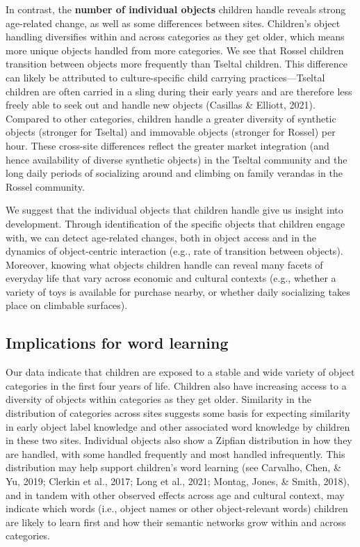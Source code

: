 \documentclass[10pt, letterpaper]{article}
\begin{document}
In contrast, the \textbf{number of individual objects} children handle
reveals strong age-related change, as well as some differences between
sites. Children's object handling diversifies within and across
categories as they get older, which means more unique objects handled
from more categories. We see that Rossel children transition between
objects more frequently than Tseltal children. This difference can
likely be attributed to culture-specific child carrying
practices---Tseltal children are often carried in a sling during their
early years and are therefore less freely able to seek out and handle
new objects (Casillas \& Elliott, 2021). Compared to other categories,
children handle a greater diversity of synthetic objects (stronger for
Tseltal) and immovable objects (stronger for Rossel) per hour. These
cross-site differences reflect the greater market integration (and hence
availability of diverse synthetic objects) in the Tseltal community and
the long daily periods of socializing around and climbing on family
verandas in the Rossel community.

We suggest that the individual objects that children handle give us
insight into development. Through identification of the specific objects
that children engage with, we can detect age-related changes, both in
object access and in the dynamics of object-centric interaction (e.g.,
rate of transition between objects). Moreover, knowing what objects
children handle can reveal many facets of everyday life that vary across
economic and cultural contexts (e.g., whether a variety of toys is
available for purchase nearby, or whether daily socializing takes place
on climbable surfaces).

\hypertarget{implications-for-word-learning}{%
\subsection{Implications for word
learning}\label{implications-for-word-learning}}

Our data indicate that children are exposed to a stable and wide variety
of object categories in the first four years of life. Children also have
increasing access to a diversity of objects within categories as they
get older. Similarity in the distribution of categories across sites
suggests some basis for expecting similarity in early object label
knowledge and other associated word knowledge by children in these two
sites. Individual objects also show a Zipfian distribution in how they
are handled, with some handled frequently and most handled infrequently.
This distribution may help support children's word learning (see
Carvalho, Chen, \& Yu, 2019; Clerkin et al., 2017; Long et al., 2021;
Montag, Jones, \& Smith, 2018), and in tandem with other observed
effects across age and cultural context, may indicate which words (i.e.,
object names or other object-relevant words) children are likely to
learn first and how their semantic networks grow within and across
categories.
\end{document}
